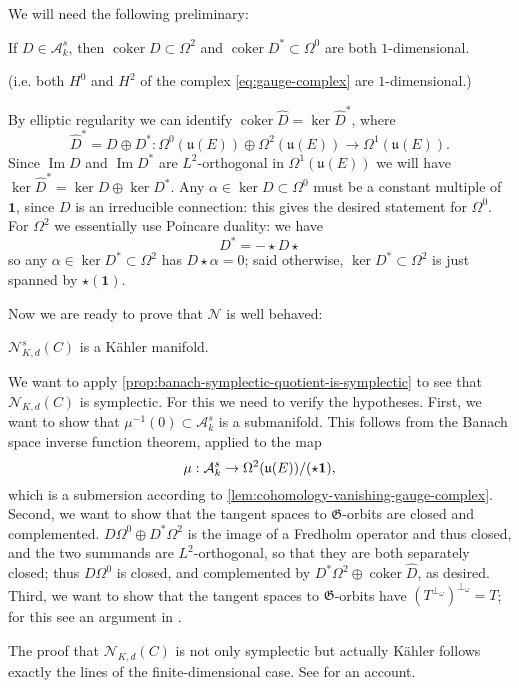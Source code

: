 \documentclass[12pt,letterpaper,reqno]{article}
\numberwithin{equation}{section}
\newcommand{\fu}{{\mathfrak u}}
\newcommand{\fG}{{\mathfrak G}}
\newcommand{\cN}{\ensuremath{\mathcal N}}
\newcommand{\cA}{\ensuremath{\mathcal A}}
\newcommand{\kahler}{K\"ahler\xspace}
\newcommand\bid{{\mathbf 1}}
\DeclareMathOperator{\im}{Im}
\DeclareMathOperator{\coker}{coker}
\begin{document}
We will need the following preliminary:
\begin{lem}
\label{lem:cohomology-vanishing-gauge-complex}
If $D \in \cA^s_k$, then
$\coker D \subset \Omega^2$ and $\coker D^* \subset \Omega^0$ are both $1$-dimensional.
\end{lem}
(i.e. both $H^0$ and $H^2$ of the complex \eqref{eq:gauge-complex} are
$1$-dimensional.)
\begin{pf}
By elliptic regularity we can identify
$\coker \hat{D} = \ker \hat{D}^*$, where
\begin{equation}
  \hat{D}^* = D \oplus D^*: \Omega^0(\fu(E)) \oplus \Omega^2(\fu(E)) \to \Omega^1(\fu(E)).
\end{equation}
Since $\im D$ and $\im D^*$ are $L^2$-orthogonal in $\Omega^1(\fu(E))$
we will have $\ker \hat{D}^* = \ker D \oplus \ker D^*$.
Any $\alpha \in \ker D \subset \Omega^0$ must be a constant multiple
of $\bid$, since $D$ is an irreducible connection: this gives
the desired statement for $\Omega^0$. For $\Omega^2$ we essentially
use Poincare duality: we have
\begin{equation}
  D^* = - \star D \star
\end{equation}
so any $\alpha \in \ker D^* \subset \Omega^2$ has $D \star \alpha = 0$; said
otherwise, $\ker D^* \subset \Omega^2$ is just spanned by $\star (\bid)$.
\end{pf}

Now we are ready to prove that $\cN$ is well behaved:
\begin{thm}[$\cN^s_{K,d}(C)$ is \kahler] \label{thm:N-is-kahler}
$\cN^s_{K,d}(C)$ is a \kahler manifold.
\end{thm}
\begin{pf}
We want to apply
\autoref{prop:banach-symplectic-quotient-is-symplectic}
to see that $\cN_{K,d}(C)$ is symplectic.
For this we need to verify the hypotheses.
First, we want
to show that $\mu^{-1}(0) \subset \cA^s_{k}$ is a submanifold.
This follows from the
Banach space inverse function theorem, applied to the map
\begin{equation}
\mu: \cA^s_k \to \Omega^2(\fu(E)) / (\star \bf 1),
\end{equation}
which is a submersion according to
\autoref{lem:cohomology-vanishing-gauge-complex}.
Second, we want to show that the tangent spaces to $\fG$-orbits are
closed and complemented.
$D \Omega^0 \oplus D^* \Omega^2$ is the image of
a Fredholm operator and thus closed, and the two summands
are $L^2$-orthogonal, so that they are both separately closed;
thus $D \Omega^0$ is closed, and complemented by
$D^* \Omega^2 \oplus \coker \hat{D}$, as desired.
Third, we want to show that the tangent spaces to $\fG$-orbits
have $(T^{\perp_\omega})^{\perp_\omega} = T$; for this
see an argument in \cite{MR909698}.

The proof that $\cN_{K,d}(C)$
is not only symplectic but actually
\kahler follows exactly the lines of the finite-dimensional
case. See \cite{Tumpach2007} for an account.
\end{pf}
\end{document}
